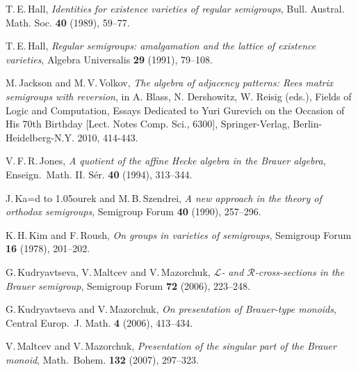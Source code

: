 \documentclass[11pt,reqno]{amsart}
\def\softd{{\leavevmode\setbox1=\hbox{d}%
    \hbox to 1.05\wd1{d\kern-0.4ex{\char039}\hss}}}
\numberwithin{equation}{section}
\theoremstyle{remark}
\begin{document}
\begin{thebibliography}{99}
T.\,E.\,Hall, \emph{Identities for existence varieties of regular
semigroups}, Bull. Austral. Math. Soc. \textbf{ 40} (1989),
59--77.

T.\,E.\,Hall, \emph{Regular semigroups: amalgamation and the
lattice of existence varieties}, Algebra Universalis \textbf{ 29}
(1991), 79--108.

 M.\,Jackson and M.\,V.\,Volkov, \emph{The algebra of adjacency patterns: Rees matrix semigroups with reversion}, in A. Blass, N. Dershowitz, W. Reisig (eds.), Fields of Logic and Computation, Essays Dedicated to Yuri Gurevich on the Occasion of His 70th Birthday [Lect. Notes Comp. Sci., 6300], Springer-Verlag, Berlin-Heidelberg-N.Y. 2010, 414-443.

V.\,F.\,R.\,Jones, \emph{A quotient of the affine Hecke algebra in
the Brauer algebra}, Enseign.\ Math. II. S\'er. \textbf{40}
(1994), 313--344.

J.\,Ka\softd{}ourek and M.\,B.\,Szendrei, \emph{A new approach in
the theory of orthodox semigroups}, Semigroup Forum \textbf{ 40}
(1990), 257--296.

K.\,H.\,Kim and F.\,Roush, \emph{On groups in varieties of
semigroups}, Semigroup Forum \textbf{ 16} (1978), 201--202.


G.\,Kudryavtseva, V.\,Maltcev and V.\,Mazorchuk, \emph{${\mathcal
L}$- and $\mathcal R$-cross-sections in the Brauer semigroup},
Semigroup Forum \textbf{72} (2006), 223--248.

G.\,Kudryavtseva and V.\,Mazorchuk, \emph{On presentation of
Brauer-type monoids}, Central Europ.\ J. Math. \textbf{4} (2006),
413--434.



V.\,Maltcev and V.\,Mazorchuk, \emph{Presentation of the singular
part of the Brauer monoid}, Math.\ Bohem. \textbf{132} (2007),
297--323.



\end{thebibliography}
\end{document}
